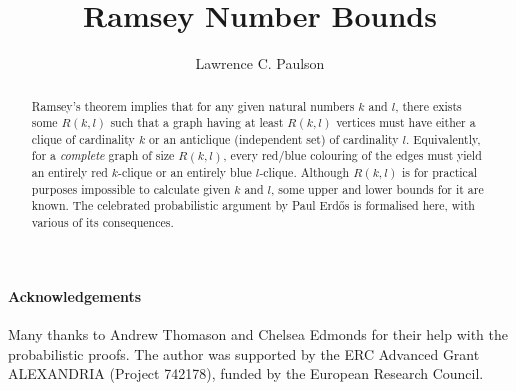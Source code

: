 \documentclass[11pt,a4paper]{article}
\begin{document}
\title{Ramsey Number Bounds}
\author{Lawrence C. Paulson}
\maketitle

\begin{abstract}
Ramsey's theorem implies that for any given natural numbers $k$ and $l$, there exists some $R(k,l)$
such that a graph having at least $R(k,l)$ vertices must have either a clique of cardinality $k$
or an anticlique (independent set) of cardinality $l$. Equivalently, for a \emph{complete} graph of size $R(k,l)$,
every red/blue colouring of the edges must yield an entirely red $k$-clique or an entirely blue $l$-clique.
Although $R(k,l)$ is for practical purposes impossible to calculate given $k$ and $l$, 
some upper and lower bounds for it are known. The celebrated probabilistic argument by Paul Erdős is 
formalised here, with various of its consequences.
\end{abstract}

\newpage
\tableofcontents

\paragraph*{Acknowledgements}
Many thanks to Andrew Thomason and Chelsea Edmonds for their help with the probabilistic proofs.
The author was supported by the ERC Advanced Grant ALEXANDRIA (Project 742178), funded by the European Research Council. 

\newpage





\end{document}
